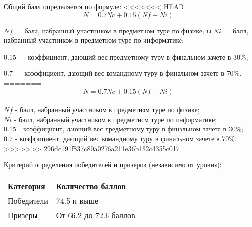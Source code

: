 Общий балл определяется по формуле:
<<<<<<< HEAD
$$N = 0.7Nc +0.15(Nf + Ni)$$

$Nf$ — балл, набранный участником в предметном туре по физике;
ы
$Ni$ — балл, набранный участником в предметном туре по информатике;

$0.15$ — коэффициент, дающий вес предметному туру в финальном зачете в 30\%;

$0.7$ — коэффициент, дающий вес командному туру в финальном зачете в 70\%.
=======
$$N = 0.7Nc +0.15(Nf + Ni)$$\\
$Nf$ - балл, набранный участником в предметном туре по физике;\\
$Ni$ - балл, набранный участником в предметном туре по информатике;\\
$0.15$ - коэффициент, дающий вес предметному туру в финальном зачете в 30\%;\\
$0.7$ - коэффициент, дающий вес командному туру в финальном зачете в 70\%.
>>>>>>> 296dc191f837c80a0276a211e36b182c4355c017

Критерий определения победителей и призеров (независимо от уровня):
\begin{center}
    \begin{tabular}{|l|l|}
        \hline
        Категория&Количество баллов\\
        \hline
        Победители&74.5 и выше\\
        \hline
        Призеры&От 66.2 до 72.6 баллов\\
        \hline
    \end{tabular}
\end{center}
